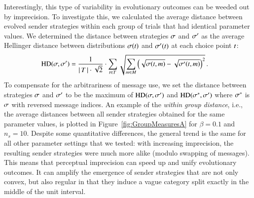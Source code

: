 \documentclass[fleqn,reqno,10pt]{article}
\begin{document}
Interestingly, this type of variability in evolutionary outcomes can
be weeded out by imprecision. To investigate this, we calculated the average
distance between evolved sender strategies within each group of trials
that had identical parameter values. We determined the distance
between strategies $\sigma$ and $\sigma'$ as the average Hellinger
distance between distributions $\sigma(t)$ and
$\sigma'(t)$ at each choice point $t$:
\begin{align*}
  \text{HD}(\sigma,\sigma') & = \frac{1}{{\left \lvert \, T \, \right\rvert \cdot
     \sqrt{2}}} \cdot  \sum_{t \in T} 
 \sqrt{\sum_{m \in  M}
         \left ( \sqrt{\sigma(t,m)} -
         \sqrt{\sigma'(t,m)} \right )^2 }\,.
\end{align*}
To compensate for the arbitrariness of message use, we set the distance between strategies
$\sigma$ and $\sigma'$ to be the maximum of $\text{HD}(\sigma,\sigma')$ and
$\text{HD}(\sigma^*,\sigma')$ where $\sigma^*$ is $\sigma$ with reversed message
indices. An example of the \emph{within group distance}, i.e., the average distances between
all sender strategies obtained for the same parameter values, is plotted in
Figure~\ref{fig:GroupMeasuresA} for $\beta = 0.1$ and $n_s = 10$. Despite some quantitative
differences, the general trend is the same for all other parameter settings that we tested:
with increasing imprecision, the resulting sender strategies were much more alike (modulo
swapping of messages). This means that perceptual imprecision can speed up and unify
evolutionary outcomes. It can amplify the emergence of sender strategies that are not only
convex, but also regular in that they induce a vague category split exactly in the middle of
the unit interval.
\end{document}
